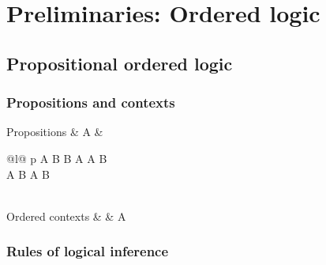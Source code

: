 \chapter{Preliminaries: Ordered logic}\label{ch:ordered-logic}

\section{Propositional ordered logic}

\subsection{Propositions and contexts}

\begin{syntax*}
  Propositions &
    A & \begin{array}[t]{@{}l@{}}
          p \mid A \limp B \mid B \pmir A
            \mid A \fuse B \mid \one \\
            \mid A \with B \mid \top
            \mid A \plus B \mid \zero
        \end{array}
  \\
  Ordered contexts &
    \octx & \octxe \mid \octx \oc A
\end{syntax*}

\subsection{Rules of logical inference}

